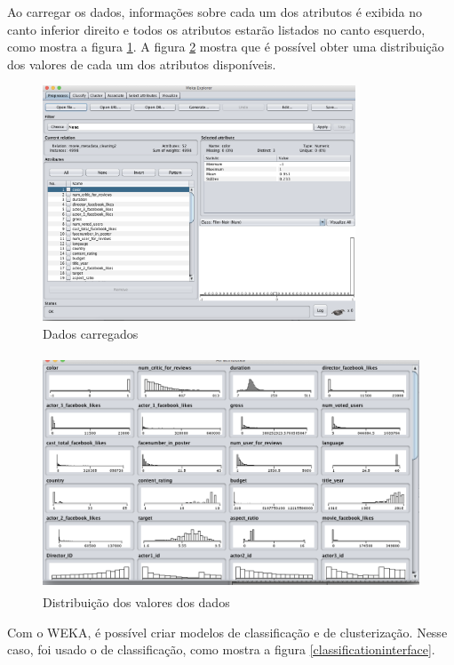 Ao carregar os dados, informações sobre cada um dos atributos é exibida no canto inferior direito e todos os atributos estarão listados no canto esquerdo, como mostra a figura \ref{loadeddata}. A figura \ref{distribuicao} mostra que é possível obter uma distribuição dos valores de cada um dos atributos disponíveis.

\begin{figure}[H]
\centering
\includegraphics[height=7cm]{imagens/wekapreprocessingfull.png}
\caption{Dados carregados}
\label{loadeddata}
\end{figure}

\begin{figure}[H]
\centering
\includegraphics[height=7cm]{imagens/wekadistribuition.png}
\caption{Distribuição dos valores dos dados}
\label{distribuicao}
\end{figure}

Com o WEKA, é possível criar modelos de classificação e de clusterização. Nesse caso, foi usado o de classificação, como mostra a figura \ref{classificationinterface}. 

